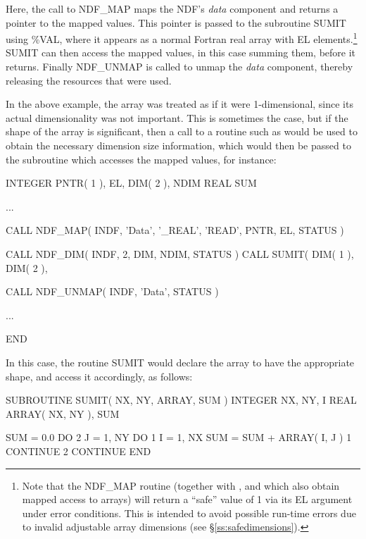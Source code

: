 \documentclass[twoside,11pt,nolof]{starlink}
\providecommand{\st}[1]{{\emph{#1}}}
\begin{document}
Here, the call to NDF\_MAP maps the NDF's \st{data\/} component and returns a
pointer to the mapped values.
This pointer is passed to the subroutine SUMIT using \%VAL, where it
appears as a normal Fortran real array with EL elements.\footnote{Note that
the NDF\_MAP routine (together with ,  and 
which also obtain mapped access to arrays) will return a ``safe'' value of 1
via its EL argument under error conditions.
This is intended to avoid possible run-time errors due to invalid
adjustable array dimensions (see \S\ref{ss:safedimensions}).}
SUMIT can then access the mapped values, in this case summing them, before
it returns.
Finally NDF\_UNMAP is called to unmap the \st{data\/} component, thereby
releasing the resources that were used.

In the above example, the array was treated as if it were 1-dimensional,
since its actual dimensionality was not important.
This is sometimes the case, but if the shape of the array is significant,
then a call to a routine such as  would be used to obtain the
necessary dimension size information, which would then be passed to the
subroutine which accesses the mapped values, for instance:

\small
\begin{terminalv}
      INTEGER PNTR( 1 ), EL, DIM( 2 ), NDIM
      REAL SUM

      ...

      CALL NDF_MAP( INDF, 'Data', '_REAL', 'READ', PNTR, EL, STATUS )

      CALL NDF_DIM( INDF, 2, DIM, NDIM, STATUS )
      CALL SUMIT( DIM( 1 ), DIM( 2 ), %

      CALL NDF_UNMAP( INDF, 'Data', STATUS )

      ...

      END
\end{terminalv}
\normalsize

In this case, the routine SUMIT would declare the array to have the
appropriate shape, and access it accordingly, as follows:

\small
\begin{terminalv}
      SUBROUTINE SUMIT( NX, NY, ARRAY, SUM )
      INTEGER NX, NY, I
      REAL ARRAY( NX, NY ), SUM

      SUM = 0.0
      DO 2 J = 1, NY
         DO 1 I = 1, NX
            SUM = SUM + ARRAY( I, J )
 1       CONTINUE
 2    CONTINUE
      END
\end{terminalv}
\normalsize
\end{document}
